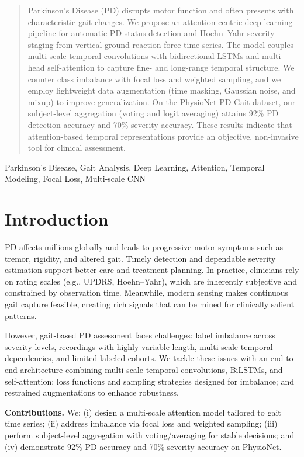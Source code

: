 \documentclass[conference]{IEEEtran}
\begin{document}
\begin{abstract}
Parkinson's Disease (PD) disrupts motor function and often presents with characteristic gait changes. We propose an attention-centric deep learning pipeline for automatic PD status detection and Hoehn--Yahr severity staging from vertical ground reaction force time series. The model couples multi-scale temporal convolutions with bidirectional LSTMs and multi-head self-attention to capture fine- and long-range temporal structure. We counter class imbalance with focal loss and weighted sampling, and we employ lightweight data augmentation (time masking, Gaussian noise, and mixup) to improve generalization. On the PhysioNet PD Gait dataset, our subject-level aggregation (voting and logit averaging) attains 92\% PD detection accuracy and 70\% severity accuracy. These results indicate that attention-based temporal representations provide an objective, non-invasive tool for clinical assessment.
\end{abstract}

\begin{IEEEkeywords}
Parkinson's Disease, Gait Analysis, Deep Learning, Attention, Temporal Modeling, Focal Loss, Multi-scale CNN
\end{IEEEkeywords}

\section{Introduction}
PD affects millions globally and leads to progressive motor symptoms such as tremor, rigidity, and altered gait. Timely detection and dependable severity estimation support better care and treatment planning. In practice, clinicians rely on rating scales (e.g., UPDRS, Hoehn--Yahr), which are inherently subjective and constrained by observation time. Meanwhile, modern sensing makes continuous gait capture feasible, creating rich signals that can be mined for clinically salient patterns.

However, gait-based PD assessment faces challenges: label imbalance across severity levels, recordings with highly variable length, multi-scale temporal dependencies, and limited labeled cohorts. We tackle these issues with an end-to-end architecture combining multi-scale temporal convolutions, BiLSTMs, and self-attention; loss functions and sampling strategies designed for imbalance; and restrained augmentations to enhance robustness.

\textbf{Contributions.} We: (i) design a multi-scale attention model tailored to gait time series; (ii) address imbalance via focal loss and weighted sampling; (iii) perform subject-level aggregation with voting/averaging for stable decisions; and (iv) demonstrate 92\% PD accuracy and 70\% severity accuracy on PhysioNet.
\end{document}
